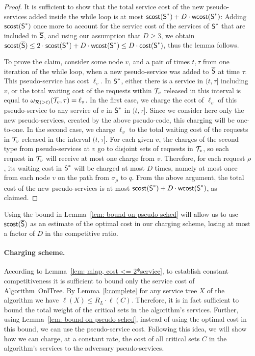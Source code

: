 \documentclass[a4paper]{article}
\newcommand{\calR}{{\cal R}}
\newcommand{\calT}{{\cal T}}
\newcommand{\cost}{\mbox{\rm\textsf{cost}}}
\newcommand{\wcost}{\mbox{\rm\textsf{wcost}}}
\newcommand{\scost}{\mbox{\rm\textsf{scost}}}
\newcommand{\length}{\ell}
\newcommand{\OnAlgTreesGeneral}{{\sc OnlTree}}
\newcommand{\optschedS}{\mbox{\rm\textsf{S}}^\ast}
\newcommand{\pseudoschedS}{\overline{\mbox{\rm\textsf{S}}}}
\newcommand{\trignode}{\sigma}
\begin{document}
\begin{proof}
It is sufficient to show that the total service cost of the new
pseudo-services added inside the while loop is at most
$\scost(\optschedS) + D\cdot \wcost(\optschedS)$: Adding
$\scost(\optschedS)$ once more to account for the service cost of the
services of $\optschedS$ that are included in $\pseudoschedS$, and
using our assumption that $D\ge 3$, we obtain $\scost(\pseudoschedS)
\leq 2\cdot\scost(\optschedS) + D\cdot \wcost(\optschedS)\leq
D\cdot\cost(\optschedS)$, thus the lemma follows.

To prove the claim, consider some node $v$, and a pair of times
$t,\tau$ from one iteration of the while loop, when a new
pseudo-service was added to $\pseudoschedS$ at time $\tau$.  This
pseudo-service has cost $\length_v$.  In $\optschedS$, either there is
a service in $(t,\tau]$ including $v$, or the total waiting cost of the
requests within $\calT_v$ released in this interval is equal to
$\omega_{\calR(>t)}(\calT_v,\tau)=\length_v$.  In the first case, we
charge the cost of $\length_v$ of this pseudo-service to any service
of $v$ in $\optschedS$ in $(t,\tau]$.  Since we consider here only the
new pseudo-services, created by the above pseudo-code, this charging
will be one-to-one.  In the second case, we charge $\length_v$ to the
total waiting cost of the requests in $\calT_v$ released in the
interval $(t,\tau]$.  For each given $v$, the charges of the second
type from pseudo-services at $v$ go to disjoint sets of requests in
$\calT_v$, so each request in $\calT_v$ will receive at most one
charge from $v$.  Therefore, for each request $\rho$, its waiting cost
in $\optschedS$ will be charged at most $D$ times, namely at most once
from each node $v$ on the path from $\trignode_\rho$ to $q$.  From the
above argument, the total cost of the new pseudo-services is at most
$\scost(\optschedS) + D\cdot \wcost(\optschedS)$, as claimed.
\end{proof}


Using the bound in Lemma~\ref{lem: bound on pseudo sched}
will allow us to use $\scost(\pseudoschedS)$ as an estimate of
the optimal cost in our charging scheme, losing at most a factor of $D$ in the
competitive ratio. 



\paragraph{Charging scheme.}

According to Lemma~\ref{lem: mlap, cost <= 2*service}, to establish constant
competitiveness it is sufficient
to bound only the service cost of Algorithm~{\OnAlgTreesGeneral}.
By Lemma~\ref{l:complete}
for any service tree $X$ of the algorithm we have $\length(X)\le R_L\cdot\length(C)$.  
Therefore, it is in fact sufficient to bound the total weight of the critical
sets in the algorithm's services. 
Further, using Lemma~\ref{lem: bound on pseudo sched}, instead of 
using the optimal cost in this bound, we can use the pseudo-service cost.
Following this idea, we will show how we can charge, at a constant rate,
the cost of
all critical sets $C$ in the algorithm's services to the adversary
pseudo-services. 
\end{document}
